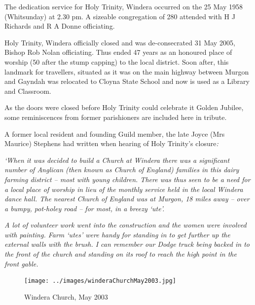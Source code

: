 The dedication service for Holy Trinity, Windera occurred on the 25 May 1958 (Whitsunday) at 2.30 pm. A sizeable congregation of 280 attended with H J Richards and R A Donne officiating.



Holy Trinity, Windera officially closed and was de-consecrated 31 May 2005, Bishop Rob Nolan officiating. Thus ended 47 years as an honoured place of worship (50 after the stump capping) to the local district. Soon after, this landmark for travellers, situated as it was on the main highway between Murgon and Gayndah was relocated to Cloyna State School and now is used as a Library and Classroom.



As the doors were closed before Holy Trinity could celebrate it Golden Jubilee, some reminiscences from former parishioners are included here in tribute.



A former local resident and founding Guild member, the late Joyce (Mrs Maurice) Stephens had written when hearing of Holy Trinity's closure\emph{:}



\emph{`When it was decided to build a Church at Windera there was a significant number of Anglican (then known as Church of England) families in this dairy farming district -- most with young children. There was thus seen to be a need for a local place of worship in lieu of the monthly service held in the local Windera dance hall. The nearest Church of England was at Murgon, 18 miles away -- over a bumpy, pot-holey road -- for most, in a breezy `ute'.}



\emph{A lot of volunteer work went into the construction and the women were involved with painting. Farm `utes' were handy for standing in to get further up the external walls with the brush. I can remember our Dodge truck being backed in to the front of the church and standing on its roof to reach the high point in the front gable.}









\begin{figure}[!htb]
\begin{center}
\texttt{[image: ../images/winderaChurchMay2003.jpg]}
\caption{Windera Church, May 2003}
\end{center}
\end{figure}




